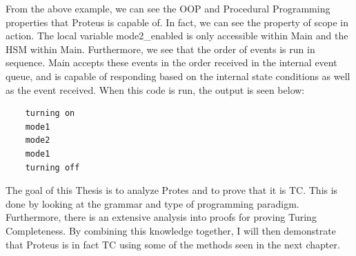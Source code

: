 From the above example, we can see the OOP and Procedural Programming properties that Proteus is capable of.
In fact, we can see the property of scope in action.
The local variable mode2\_enabled is only accessible within Main and the HSM within Main.
Furthermore, we see that the order of events is run in sequence.
Main accepts these events in the order received in the internal event queue, and is capable of responding based on the internal state conditions as well as the event received.
When this code is run, the output is seen below:

\begin{verbatim}
    turning on
    mode1
    mode2
    mode1
    turning off
\end{verbatim}

The goal of this Thesis is to analyze Protes and to prove that it is TC.
This is done by looking at the grammar and type of programming paradigm.
Furthermore, there is an extensive analysis into proofs for proving Turing Completeness.
By combining this knowledge together, I will then demonstrate that Proteus is in fact TC using some of the methods seen in the next chapter.